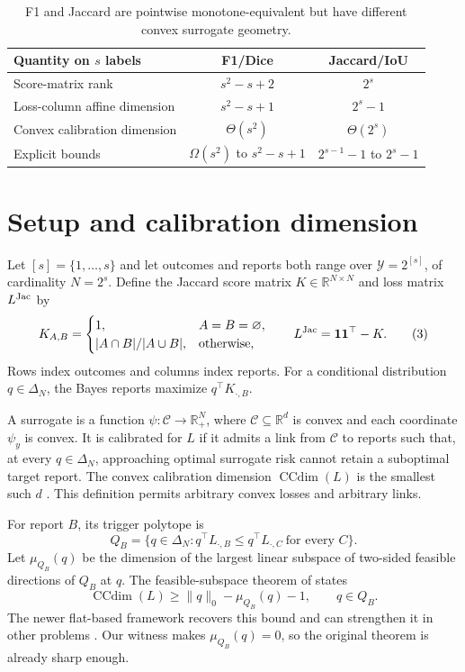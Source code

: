 \documentclass{article}
\newcommand{\R}{\mathbb R}
\newcommand{\1}{\mathbf 1}
\newcommand{\CCdim}{\operatorname{CCdim}}
\begin{document}
\begin{table}[t]
\centering
\caption{F1 and Jaccard are pointwise monotone-equivalent but have different
convex surrogate geometry.}
\label{tab:separation}
\begin{tabular}{lcc}
\toprule
Quantity on $s$ labels & F1/Dice & Jaccard/IoU\\
\midrule
Score-matrix rank & $s^2-s+2$ & $2^s$\\
Loss-column affine dimension & $s^2-s+1$ & $2^s-1$\\
Convex calibration dimension & $\Theta(s^2)$ & $\Theta(2^s)$\\
Explicit bounds & $\Omega(s^2)$ to $s^2-s+1$
                & $2^{s-1}-1$ to $2^s-1$\\
\bottomrule
\end{tabular}
\end{table}

\section{Setup and calibration dimension}
\label{sec:setup}

Let $[s]=\{1,\ldots,s\}$ and let outcomes and reports both range over $\mathcal Y=2^{[s]}$, of cardinality $N=2^s$. Define the Jaccard score matrix $K\in\R^{N\times N}$ and loss matrix $L^{\rm Jac}$ by \[
 K_{A,B}=\begin{cases}
  1,&A=B=\varnothing,\\
  |A\cap B|/|A\cup B|,&\text{otherwise},
 \end{cases}
\qquad L^{\rm Jac}=\1\1^\top-K. \tag{3}\label{eq:jacmatrix} \] Rows index outcomes and columns index reports. For a conditional distribution $q\in\Delta_N$, the Bayes reports maximize $q^\top K_{\cdot,B}$.

A surrogate is a function $\psi:\mathcal C\to\R_+^N$, where $\mathcal C\subseteq\R^d$ is convex and each coordinate $\psi_y$ is convex. It is calibrated for $L$ if it admits a link from $\mathcal C$ to reports such that, at every $q\in\Delta_N$, approaching optimal surrogate risk cannot retain a suboptimal target report. The convex calibration dimension $\CCdim(L)$ is the smallest such $d$ \citep{ramaswamy2016ccdim}. This definition permits arbitrary convex losses and arbitrary links.

For report $B$, its trigger polytope is \[ Q_B=\{q\in\Delta_N:q^\top L_{\cdot,B} \leq q^\top L_{\cdot,C}\ \text{for every }C\}. \tag{4}\label{eq:trigger} \] Let $\mu_{Q_B}(q)$ be the dimension of the largest linear subspace of two-sided feasible directions of $Q_B$ at $q$. The feasible-subspace theorem of \citet{ramaswamy2016ccdim} states \[ \CCdim(L)\geq \|q\|_0-\mu_{Q_B}(q)-1, \qquad q\in Q_B. \tag{5}\label{eq:ramalower} \] The newer flat-based framework recovers this bound and can strengthen it in other problems \citep{finocchiaro2021lower}. Our witness makes $\mu_{Q_B}(q)=0$, so the original theorem is already sharp enough.
\end{document}
